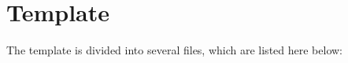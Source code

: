 
\section{Template}
\label{sec:Template}

The template is divided into several files, which are listed here below:

